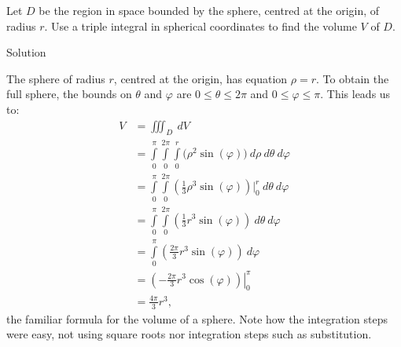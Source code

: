 \begin{example}
\label{ex_spherical2}
Let $D$ be the region in space bounded by the sphere, centred at the origin, of radius $r$. Use a triple integral in spherical coordinates to find the volume $V$ of $D$.

Solution 

The sphere of radius $r$, centred at the origin, has equation $\rho = r$. To obtain the full sphere, the bounds on $\theta$ and $\varphi$ are $0\leq \theta \leq 2\pi$ and $0 \leq \varphi \leq \pi$. This leads us to:
\allowdisplaybreaks
\begin{align*}
V &= \iiint_D\ dV\\
	&= \int\limits_0^{\pi}\int\limits_0^{2\pi}\int\limits_0^r\big(\rho^2\sin(\varphi)\big)\ d\rho\ d\theta\ d\varphi\\[0.2cm]
	&= \int\limits_0^\pi\int\limits_0^{2\pi}\left(\frac13\rho^3\sin(\varphi)\right)\Bigg|_0^r\ d\theta\ d\varphi\\[0.2cm]
	&= \int\limits_0^\pi\int\limits_0^{2\pi} \left(\frac13r^3\sin(\varphi)\right)\ d\theta\ d\varphi\\[0.2cm]
	&= \int\limits_0^\pi \left(\frac{2\pi}3r^3\sin(\varphi)\right)\ d\varphi\\[0.2cm]
	&= \left.\left(-\frac{2\pi}3r^3\cos(\varphi)\right)\right|_0^{\pi}\\[0.2cm]
	&= \frac{4\pi}3r^3,
\end{align*}
the familiar formula for the volume of a sphere. Note how the integration steps were easy, not using square roots nor integration steps such as substitution.
\end{example}

